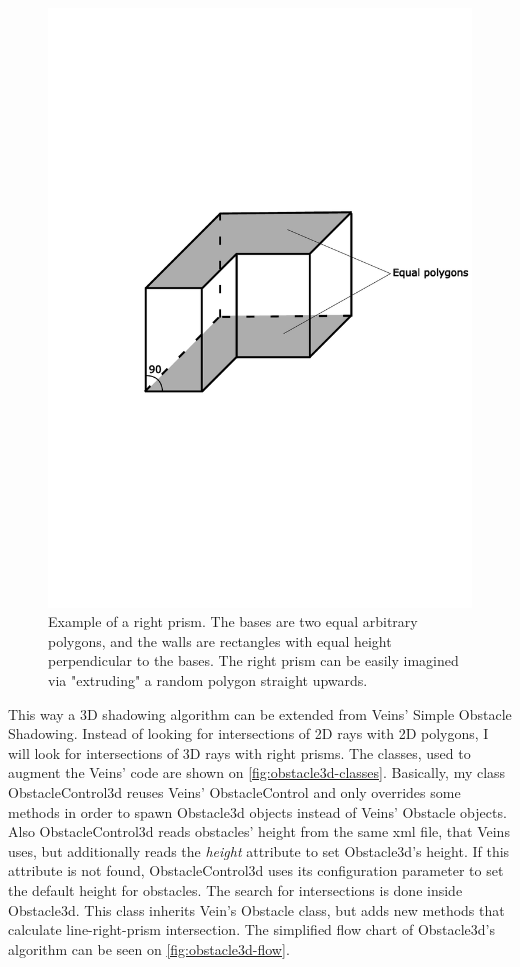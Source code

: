\documentclass[]{nsm-thesis}
\begin{document}
\begin{figure}
	\centering
	\includegraphics[width=1\textwidth]{figures/RightPrism.pdf}
	\caption{Example of a right prism. The bases are two equal arbitrary polygons, and the walls are rectangles with equal height perpendicular to the bases. The right prism can be easily imagined via "extruding" a random polygon straight upwards.}
	\label{fig:rightprism}
\end{figure}

This way a 3D shadowing algorithm can be extended from Veins' Simple Obstacle Shadowing. Instead of looking for intersections of 2D rays with 2D polygons, I will look for intersections of 3D rays with right prisms. The classes, used to augment the Veins' code are shown on \cref{fig:obstacle3d-classes}.  Basically, my class ObstacleControl3d reuses Veins' ObstacleControl and only overrides some methods in order to spawn Obstacle3d objects instead of Veins' Obstacle objects. Also ObstacleControl3d reads obstacles' height from the same xml file, that Veins uses, but additionally reads the \emph{height} attribute to set Obstacle3d's height. If this attribute is not found, ObstacleControl3d uses its configuration parameter to set the default height for obstacles. The search for intersections is done inside Obstacle3d. This class inherits Vein's Obstacle class, but adds new methods that calculate line-right-prism intersection. The simplified flow chart of Obstacle3d's algorithm can be seen on \cref{fig:obstacle3d-flow}. 
\end{document}
